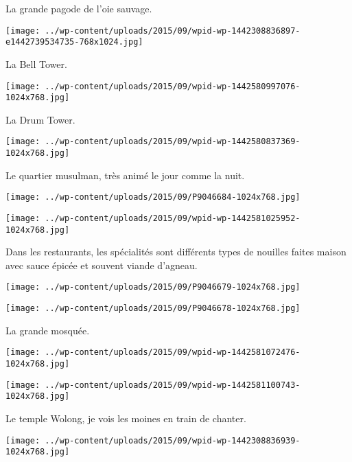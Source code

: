  La grande pagode de l'oie sauvage.
\begin{center} \texttt{[image: ../wp-content/uploads/2015/09/wpid-wp-1442308836897-e1442739534735-768x1024.jpg]} \end{center}

 La Bell Tower.
\begin{center} \texttt{[image: ../wp-content/uploads/2015/09/wpid-wp-1442580997076-1024x768.jpg]} \end{center}

 La Drum Tower. 
\begin{center} \texttt{[image: ../wp-content/uploads/2015/09/wpid-wp-1442580837369-1024x768.jpg]} \end{center}

 Le quartier musulman, très animé le jour comme la nuit.
\begin{center} \texttt{[image: ../wp-content/uploads/2015/09/P9046684-1024x768.jpg]} \end{center}
\begin{center} \texttt{[image: ../wp-content/uploads/2015/09/wpid-wp-1442581025952-1024x768.jpg]} \end{center}

 Dans les restaurants, les spécialités sont différents types de nouilles faites maison avec sauce épicée et souvent viande d'agneau. 
\begin{center} \texttt{[image: ../wp-content/uploads/2015/09/P9046679-1024x768.jpg]} \end{center}
\begin{center} \texttt{[image: ../wp-content/uploads/2015/09/P9046678-1024x768.jpg]} \end{center}

 La grande mosquée.
\begin{center} \texttt{[image: ../wp-content/uploads/2015/09/wpid-wp-1442581072476-1024x768.jpg]} \end{center}
\begin{center} \texttt{[image: ../wp-content/uploads/2015/09/wpid-wp-1442581100743-1024x768.jpg]} \end{center}
 
 Le temple Wolong, je vois les moines en train de chanter. 
\begin{center} \texttt{[image: ../wp-content/uploads/2015/09/wpid-wp-1442308836939-1024x768.jpg]} \end{center}
\vspace{-\topsep}
\pagebreak

